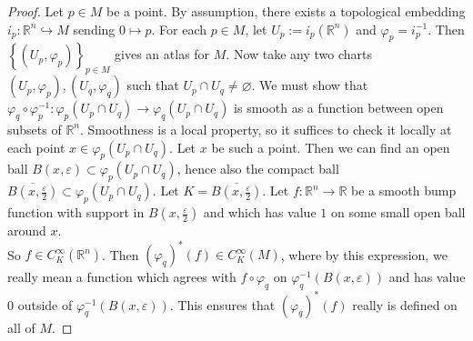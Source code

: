 \documentclass[reqno]{amsart}
\theoremstyle{definition}
\theoremstyle{remark}
\begin{document}
\begin{proof}
        Let $p \in M$ be a point. By assumption, there
        exists a topological embedding $i_p \colon
        \mathbb{R}^{n} \hookrightarrow M$ sending
        $0 \mapsto p$.  For each $p \in M$, let
        $U_p := i_p \left( \mathbb{R}^{n} \right) $ and
        $\varphi_p = i_p^{-1}$. Then
        $\left\{ \left( U_p, \varphi_p \right)  \right\}_{p
        \in M}$ gives an atlas for
        $M$. Now take any two charts
        $\left( U_p, \varphi_p \right) ,
        \left( U_q, \varphi_q \right) $ such that
        $U_p \cap U_q \neq \varnothing$.
        We must show that
        $\varphi_{q} \circ \varphi_{p}^{-1}
        \colon
        \varphi_p \left( U_p \cap U_q \right) 
        \to \varphi_q \left( U_p \cap U_q \right) $ is
        smooth as a function
        between open subsets
        of  $\mathbb{R}^{n}$. Smoothness is a local property, so
        it suffices to check it locally at each point
        $x \in \varphi_p \left( U_p \cap U_q \right) $. Let
        $x$ be such a point. Then we can find an
        open ball $B\left( x, \varepsilon \right) 
        \subset \varphi_p \left( U_p \cap U_q \right) $, hence
        also the compact ball
        $\overline{B \left( x, \frac{\varepsilon}{2} \right) }
        \subset \varphi_p \left( U_p \cap U_q \right) $.
        Let $K = \overline{B\left( x, \frac{\varepsilon}{2}
        \right) }$.
        Let $f \colon
        \mathbb{R}^{n} \to \mathbb{R}$ be
        a smooth bump function with
        support
        in $B \left( x, \frac{\varepsilon}{2} \right) $ and
        which has value $1$ on some small open
        ball around $x$.\\
        So
        $f \in C_K^{\infty}\left( \mathbb{R}^{n} \right) $.
        Then $\left( \varphi_q \right)^*
        (f) \in C_K^{\infty}(M)$, where
        by this expression, we really mean a function
        which agrees with
        $f \circ \varphi_q$ on
        $\varphi_q^{-1}\left( B\left( x, \varepsilon \right) 
        \right) $ and
        has value $0$ outside of
        $\varphi_q^{-1}\left( B\left( x, \varepsilon \right) 
        \right) $. This ensures
        that $\left( \varphi_q \right)^{*}(f)$ really
        is defined on all of $M$.
        

\end{proof}
\end{document}
